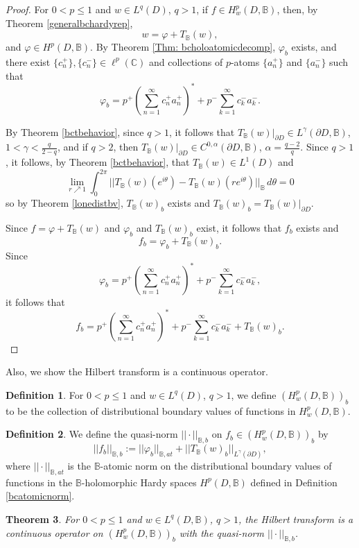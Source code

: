 \documentclass[suppldata]{interact}
\theoremstyle{plain}%
\newtheorem{theorem}{Theorem}[section]
\theoremstyle{definition}
\newtheorem{deff}[theorem]{Definition}
\theoremstyle{remark}
\newcommand{\C}{\mathbb C}
\newcommand{\p}{\partial}
\newcommand{\bc}{\mathbb{B}}
\begin{document}
\begin{proof}
For $0 < p \leq 1$ and $w \in L^q(D)$, $q>1$, if $f \in H^p_w(D,\bc)$, then, by Theorem \ref{generalbchardyrep},
\[
    w = \varphi + T_\bc(w),
\]
and $\varphi \in H^p(D,\bc)$. By Theorem \ref{Thm: bcholoatomicdecomp}, $\varphi_b$ exists, and there exist $\{c_n^+\}, \{c_n^-\} \in \ell^p(\C)$ and collections of $p$-atoms $\{a_n^+\}$ and $\{a_n^-\}$ such that
\[
    \varphi_b = p^+ \left( \sum_{n=1}^\infty c^+_n a^+_n\right)^* + p^- \sum_{k=1}^\infty c^-_k a^-_k.
\]

By Theorem \ref{bctbehavior}, since $q >1$, it follows that $T_\bc(w)|_{\p D} \in L^\gamma(\p D, \bc)$, $1 < \gamma< \frac{q}{2-q}$, and if $q>2$, then $T_\bc(w)|_{\p D} \in C^{0,\alpha}(\p D,\bc)$, $\alpha = \frac{q-2}{q}$. Since $q>1$, it follows, by Theorem \ref{bctbehavior}, that $T_\bc(w) \in L^1(D)$ and 
\[
    \lim_{r \nearrow 1} \int_0^{2\pi} ||T_\bc(w)(e^{i\theta})- T_\bc(w)(re^{i\theta})||_{\bc}\,d\theta = 0
\]
so by Theorem \ref{lonedistbv}, $T_\bc(w)_b$ exists and $T_\bc(w)_b = T_\bc(w)|_{\p D}$. 

Since $f = \varphi + T_\bc(w)$ and $\varphi_b$ and $T_\bc(w)_b$ exist, it follows that $f_b$ exists and 
\[
    f_b = \varphi_b + T_\bc(w)_b.
\]
Since 
\[
    \varphi_b = p^+ \left( \sum_{n=1}^\infty c^+_n a^+_n\right)^* + p^- \sum_{k=1}^\infty c^-_k a^-_k,
\]
it follows that 
\[
        f_b = p^+ \left( \sum_{n=1}^\infty c^+_n a^+_n\right)^* + p^- \sum_{k=1}^\infty c^-_k a^-_k + T_\bc(w)_b.
\]
\end{proof}

Also, we show the Hilbert transform is a continuous operator.

\begin{deff}
    For $0 < p \leq 1$ and $w \in L^q(D)$, $q>1$, we define $(H^p_w(D,\bc))_b$ to be the collection of distributional boundary values of functions in $H^p_w(D,\bc)$. 
\end{deff}

\begin{deff}
    We define the quasi-norm $||\cdot||_{\bc,b}$ on $f_b \in (H^p_w(D,\bc))_b$ by 
    \[
        ||f_b||_{\bc,b} := ||\varphi_b||_{\bc,at} + ||T_\bc(w)_b||_{L^\gamma(\p D)},
    \]
    where $||\cdot||_{\bc,at}$ is the $\bc$-atomic norm on the distributional boundary values of functions in the $\bc$-holomorphic Hardy spaces $H^p(D,\bc)$ defined in Definition \ref{bcatomicnorm}.
\end{deff}

\begin{theorem}\label{Thm: bcnonhomoghhilbertrans}
    For $0 < p \leq 1$ and $w \in L^q(D,\bc)$, $q>1$, the Hilbert transform is a continuous operator on $(H^p_w(D,\bc))_b$ with the quasi-norm $||\cdot||_{\bc,b}$. 
\end{theorem}
\end{document}
